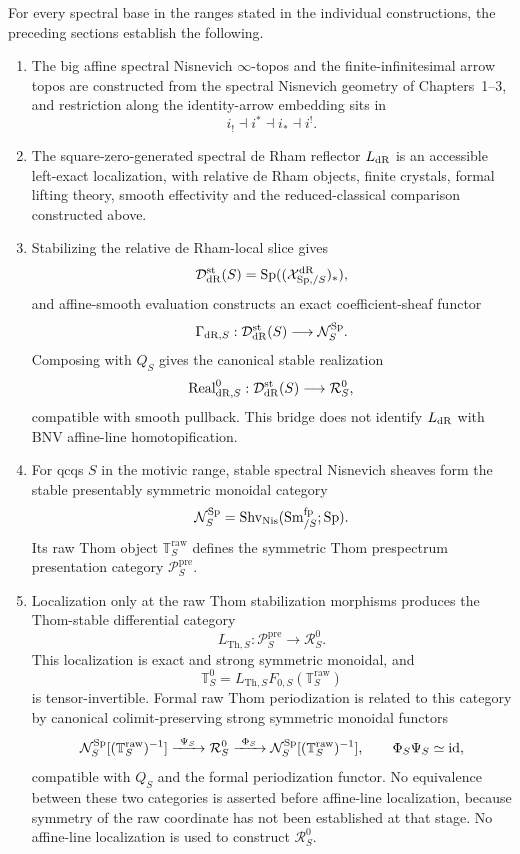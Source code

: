 \begin{theorem}
\label{thm:bn-diff-final-package}
For every spectral base in the ranges stated in the individual constructions,
the preceding sections establish the following.

\begin{enumerate}
\item The big affine spectral Nisnevich \(\infty\)-topos and the
finite-infinitesimal arrow topos are constructed from the spectral Nisnevich
geometry of Chapters~1--3, and restriction along the identity-arrow embedding
sits in
\[
  i_!\dashv i^*\dashv i_*\dashv i^!.
\]

\item The square-zero-generated spectral de Rham reflector \(L_{\mathrm{dR}}\) is an
accessible left-exact localization, with relative de Rham objects, finite
crystals, formal lifting theory, smooth effectivity and the reduced-classical
comparison constructed above.

\item Stabilizing the relative de Rham-local slice gives
\[
  \mathcal D_{\mathrm{dR}}^{\mathrm{st}}(S)
  =
  \operatorname{Sp}((\mathcal X_{\mathrm{Sp},/S}^{\mathrm{dR}})_*),
\]
and affine-smooth evaluation constructs an exact coefficient-sheaf functor
\[
  \Gamma_{\mathrm{dR},S}:
  \mathcal D_{\mathrm{dR}}^{\mathrm{st}}(S)
  \longrightarrow
  \mathcal N_S^{\mathrm{Sp}}.
\]
Composing with \(Q_S\) gives the canonical stable realization
\[
  \operatorname{Real}_{\mathrm{dR},S}^0:
  \mathcal D_{\mathrm{dR}}^{\mathrm{st}}(S)
  \longrightarrow
  \mathcal R_S^0,
\]
compatible with smooth pullback.  This bridge does not identify
\(L_{\mathrm{dR}}\) with BNV affine-line homotopification.

\item For qcqs \(S\) in the motivic range, stable spectral Nisnevich sheaves
form the stable presentably symmetric monoidal category
\[
  \mathcal N_S^{\mathrm{Sp}}
  =\operatorname{Shv}_{\mathrm{Nis}}
  (\operatorname{Sm}^{\mathrm{fp}}_{/S};\mathrm{Sp}).
\]
Its raw Thom object \(\mathbb T_S^{\mathrm{raw}}\) defines the symmetric Thom
prespectrum presentation category \(\mathcal P_S^{\mathrm{pre}}\).

\item Localization only at the raw Thom stabilization morphisms produces the
Thom-stable differential category
\[
  \boxed{
  L_{\mathrm{Th},S}:
  \mathcal P_S^{\mathrm{pre}}
  \longrightarrow
  \mathcal R_S^0.
  }
\]
This localization is exact and strong symmetric monoidal, and
\[
  \mathbb T_S^0
  =L_{\mathrm{Th},S}F_{0,S}(\mathbb T_S^{\mathrm{raw}})
\]
is tensor-invertible.  Formal raw Thom periodization is related to this
category by canonical colimit-preserving strong symmetric monoidal functors
\[
  \mathcal N_S^{\mathrm{Sp}}[(\mathbb T_S^{\mathrm{raw}})^{-1}]
  \xrightarrow{\ \Psi_S\ }
  \mathcal R_S^0
  \xrightarrow{\ \Phi_S\ }
  \mathcal N_S^{\mathrm{Sp}}[(\mathbb T_S^{\mathrm{raw}})^{-1}],
  \qquad
  \Phi_S\Psi_S\simeq\operatorname{id},
\]
compatible with $Q_S$ and the formal periodization functor.  No equivalence
between these two categories is asserted before affine-line localization,
because symmetry of the raw coordinate has not been established at that
stage.  No affine-line localization is used to construct
$\mathcal R_S^0$.


\end{enumerate}
\end{theorem}
